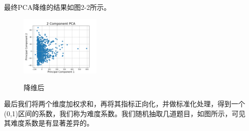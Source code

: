 \documentclass[UTF8]{ctexart}
\begin{document}
	\par 最终PCA降维的结果如图2-2所示。
	\begin{figure}[!htbp]
		\centering
		\includegraphics[width=0.35\textwidth]{Figure_1.png}\\
		\caption{降维后}
	\end{figure}
	\par 最后我们将两个维度加权求和，再将其指标正向化，并做标准化处理，得到一个(0,1)区间的系数，我们称为难度系数。我们随机抽取几道题目，如图所示，可见其难度系数是有显著差异的。
\end{document}
